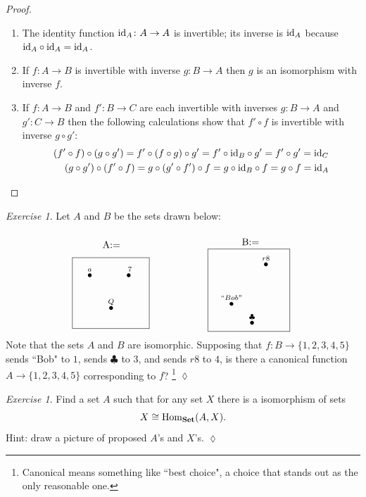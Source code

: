\documentclass{book}
\def\tn{\textnormal}
\def\Hom{\tn{Hom}}
\newcommand{\boxtitle}[1]{\begin{center}#1\end{center}\vspace{-.1in}}
\def\to{\rightarrow}
\def\taking{\colon}
\def\iso{\cong}
\newcommand{\LMO}[1]{\stackrel{#1}{\bullet}}
\def\id{\tn{id}}
\def\Set{{\bf Set}}
\theoremstyle{remark}
\newtheorem{exc}[subsubsection]{Exercise}
\newenvironment{exercise}{\begin{exc}}{\hspace*{\fill}$\lozenge$\end{exc}}
\theoremstyle{definition}
\begin{document}
\begin{proof}

\begin{enumerate}
\item The identity function $\id_A\taking A\to A$ is invertible; its inverse is $\id_A$ because $\id_A\circ\id_A=\id_A$.
\item If $f\taking A\to B$ is invertible with inverse $g\taking B\to A$ then $g$ is an isomorphism with inverse $f$.
\item If $f\taking A\to B$ and $f'\taking B\to C$ are each invertible with inverses $g\taking B\to A$ and $g'\taking C\to B$ then the following calculations show that $f'\circ f$ is invertible with inverse $g\circ g'$: 
\begin{align*}
(f'\circ f)\circ(g\circ g')=f'\circ(f\circ g)\circ g'=f'\circ\id_B\circ g'=f'\circ g'=\id_C\\
(g\circ g')\circ(f'\circ f)=g\circ(g'\circ f')\circ f=g\circ\id_B\circ f=g\circ f=\id_A
\end{align*}
\end{enumerate}

\end{proof}

\begin{exercise}\label{exc:functions are not iso invariant}
Let $A$ and $B$ be the sets drawn below:
$$
\parbox{1.1in}{\boxtitle{A:=}\fbox{\xymatrix@=1pt{\\&\LMO{\;a\;}&&&\LMO{\;\;\;7\;\;}&\\\\\\&&&\LMO{Q}\\&}}}
\hspace{.8in}
\parbox{1.2in}{\boxtitle{B:=}\fbox{\xymatrix@=1pt{&&&\LMO{r8}&&\\\\\\\\&\LMO{``Bob"}\\&&\LMO{\clubsuit}}}}
$$
Note that the sets $A$ and $B$ are isomorphic. Supposing that $f\taking B\to\{1,2,3,4,5\}$ sends ``Bob" to $1$, sends $\clubsuit$ to $3$, and sends $r8$ to $4$, is there a canonical function $A\to\{1,2,3,4,5\}$ corresponding to $f$?
\footnote{Canonical means something like ``best choice", a choice that stands out as the only reasonable one.}
\end{exercise}

\begin{exercise}\label{exc:generator for set}
Find a set $A$ such that for any set $X$ there is a isomorphism of sets $$X\iso\Hom_\Set(A,X).$$ Hint: draw a picture of proposed $A$'s and $X$'s.
\end{exercise}
\end{document}
